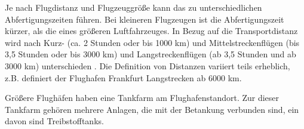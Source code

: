 %
Je nach Flugdistanz und Flugzeuggröße kann das zu unterschiedlichen Abfertigungszeiten führen. 
Bei kleineren Flugzeugen ist die Abfertigungszeit kürzer, als die eines größeren Luftfahrzeuges. 
In Bezug auf die Transportdistanz wird nach Kurz- (ca. 2 Stunden oder bis 1000 km) 
und Mittelstreckenflügen (bis 3,5 Stunden oder bis 3000 km) und 
Langstreckenflügen (ab 3,5 Stunden und ab 3000 km) unterschieden \cite{mensen2013handbuch}.
Die Definition von Distanzen variiert teils erheblich, 
z.B. definiert der Flughafen Frankfurt Langstrecken ab 6000 km.%


Größere Flughäfen haben eine Tankfarm am Flughafenstandort. 
Zur dieser Tankfarm gehören mehrere Anlagen, die mit der Betankung verbunden sind, 
ein davon sind Treibstofftanks.
